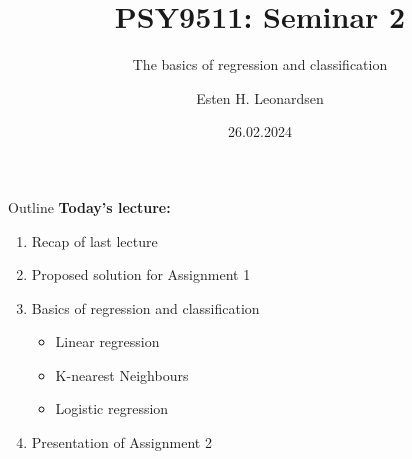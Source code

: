 \documentclass[10pt]{beamer}
\title{PSY9511: Seminar 2}
\subtitle{The basics of regression and classification}
\author{Esten H. Leonardsen}
\date{26.02.2024}
\begin{document}
	\begin{frame}
	 	\titlepage
	\end{frame}

    \begin{frame}{Outline}
        \textbf{Today's lecture:}
        \begin{enumerate}
            \item Recap of last lecture
            \item Proposed solution for Assignment 1
            \item Basics of regression and classification
            \begin{itemize}
                \item Linear regression
                \item K-nearest Neighbours
                \item Logistic regression
            \end{itemize}
            \item Presentation of Assignment 2
        \end{enumerate}
    \end{frame}

    
    
    
    
    
\end{document}
